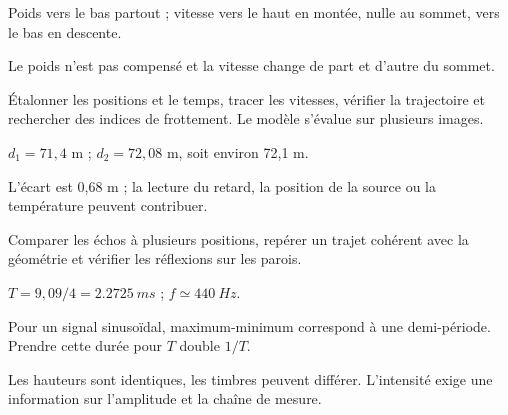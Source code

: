 \begin{questions}
\item Poids vers le bas partout ; vitesse vers le haut en montée, nulle au sommet, vers le bas en descente.
\item Le poids n’est pas compensé et la vitesse change de part et d’autre du sommet.
\item Étalonner les positions et le temps, tracer les vitesses, vérifier la trajectoire et rechercher des indices de frottement. Le modèle s’évalue sur plusieurs images.
\end{questions}

\begin{questions}
\item $d_1=71,4$ m ; $d_2=72,08$ m, soit environ 72,1 m.
\item L’écart est 0,68 m ; la lecture du retard, la position de la source ou la température peuvent contribuer.
\item Comparer les échos à plusieurs positions, repérer un trajet cohérent avec la géométrie et vérifier les réflexions sur les parois.
\end{questions}

\begin{questions}
\item $T=9,09/4=\qty{2,2725}{ms}$ ; $f\simeq\qty{440}{Hz}$.
\item Pour un signal sinusoïdal, maximum-minimum correspond à une demi-période. Prendre cette durée pour $T$ double $1/T$.
\item Les hauteurs sont identiques, les timbres peuvent différer. L’intensité exige une information sur l’amplitude et la chaîne de mesure.
\end{questions}

